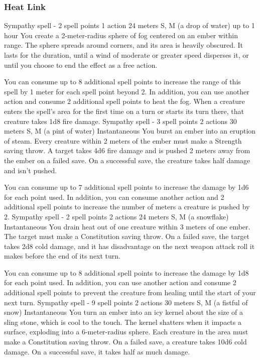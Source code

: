 \subsubsection{Heat Link}
        {Sympathy spell - 2 spell points}
        {1 action}
        {24 meters}
        {S, M (a drop of water)}
        {up to 1 hour}
        You create a 2-meter-radius sphere of fog centered on an ember within range.
        The sphere spreads around corners, and its area is heavily obscured.
        It lasts for the duration, until a wind of moderate or greater speed disperses it, or until you choose to end the effect as a free action.

        You can consume up to 8 additional spell points to increase the range of this spell by 1 meter for each spell point beyond 2.
        In addition, you can use another action and consume 2 additional spell points to heat the fog.
        When a creature enters the spell's area for the first time on a turn or starts its turn there, that creature takes 1d8 fire damage.
        {Sympathy spell - 3 spell points}
        {2 actions}
        {30 meters}
        {S, M (a pint of water)}
        {Instantaneous}
        You burst an ember into an eruption of steam.
        Every creature within 2 meters of the ember must make a Strength saving throw.
        A target takes 4d6 fire damage and is pushed 2 meters away from the ember on a failed save.
        On a successful save, the creature takes half damage and isn't pushed.

        You can consume up to 7 additional spell points to increase the damage by 1d6 for each point used.
        In addition, you can consume another action and 2 additional spell points to increase the number of meters a creature is pushed by 2.
        {Sympathy spell - 2 spell points}
        {2 actions}
        {24 meters}
        {S, M (a snowflake)}
        {Instantaneous}
        You drain heat out of one creature within 3 meters of one ember.
        The target must make a Constitution saving throw.
        On a failed save, the target takes 2d8 cold damage, and it has disadvantage on the next weapon attack roll it makes before the end of its next turn.

        You can consume up to 8 additional spell points to increase the damage by 1d8 for each point used.
        In addition, you can use another action and consume 2 additional spell points to prevent the creature from healing until the start of your next turn.
        {Sympathy spell - 9 spell points}
        {2 actions}
        {30 meters}
        {S, M (a fistful of snow)}
        {Instantaneous}
        You turn an ember into an icy kernel about the size of a sling stone, which is cool to the touch.
        The kernel shatters when it impacts a surface, exploding into a 6-meter-radius sphere.
        Each creature in the area must make a Constitution saving throw.
        On a failed save, a creature takes 10d6 cold damage.
        On a successful save, it takes half as much damage.

